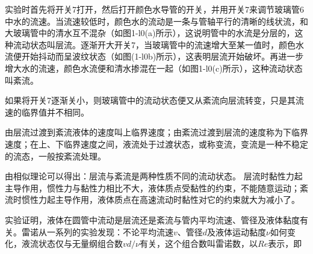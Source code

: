 实验时首先将开关7打开，然后打开颜色水导管的开关，并用开关7来调节玻璃管6中水的流速。当流速较低时，颜色水的流动是一条与管轴平行的清晰的线状流，和大玻璃管中的清水互不混杂（如图1-l0(a)所示），这说明管中的水流是分层的，这种流动状态叫层流。逐渐开大开关7，当玻璃管中的流速增大至某一值时，颜色水流便开始抖动而呈波纹状态（如图(1-l0b)所示），这表明层流开始破坏。再进一步增大水的流速，颜色水流便和清水掺混在一起（如图1-l0(c)所示），这种流动状态叫紊流。

如果将开关7逐渐关小，则玻璃管中的流动状态便又从紊流向层流转变，只是其流速的临界值并不相同。

由层流过渡到紊流液体的速度叫上临界速度；由紊流过渡到层流的速度称为下临界速度；在上、下临界速度之间，液流处于过渡状态，或称变流，变流是一种不稳定的流态，一般按紊流处理。

由相似理论可以得出：层流与紊流是两种性质不同的流动状态。 层流时黏性力起主导作用，惯性力与黏性力相比不大，液体质点受黏性的约束，不能随意运动；紊流时惯性力起主导作用，液体质点在高速流动时黏性对它的约束就大为减小了。

实验证明，液体在圆管中流动是层流还是紊流与管内平均流速、管径及液体黏度有关。雷诺从一系列的实验发现：不论平均流速$v$、管径$d$及液体运动黏度$\nu $如何变化，液流状态仅与无量纲组合数$vd/\nu $有关，这个组合数叫雷诺数，以$Re$表示，即
